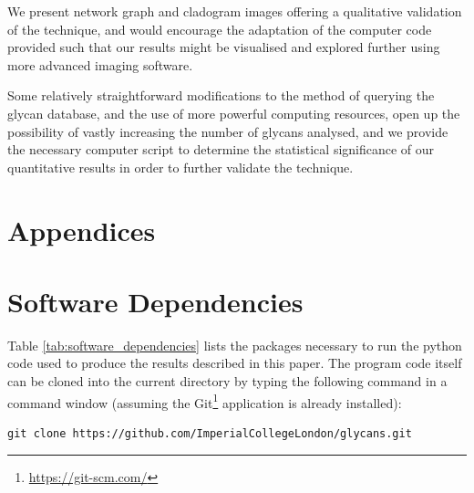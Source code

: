 \documentclass[12pt,a4paper]{article}
\begin{document}
We present network graph and cladogram images offering a qualitative validation of the technique, and would encourage the adaptation of the computer code provided such that our results might be visualised and explored further using more advanced imaging software.

Some relatively straightforward modifications to the method of querying the glycan database, and the use of more powerful computing resources, open up the possibility of vastly increasing the number of glycans analysed, and we provide the necessary computer script to determine the statistical significance of our quantitative results in order to further validate the technique.

\newpage




\newpage
\section*{Appendices}
\appendix
\section{Software Dependencies}
\label{sec:software_dependencies}
Table \ref{tab:software_dependencies} lists the packages necessary to run the python code used to produce the results described in this paper. The program code itself can be cloned into the current directory by typing the following command in a command window (assuming the Git\footnote{\url{https://git-scm.com/}} application is already installed):

\begin{verbatim}
git clone https://github.com/ImperialCollegeLondon/glycans.git
\end{verbatim}
\end{document}
